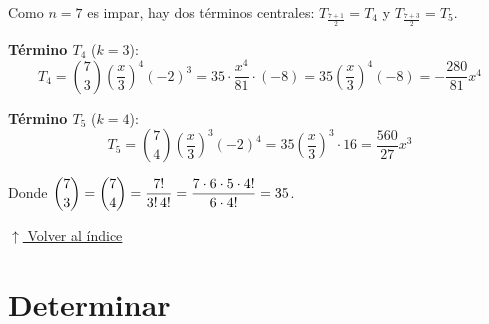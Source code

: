 \documentclass[12pt]{article}
\newcommand{\volverindice}{%
    \vspace{1em}%
    \begin{flushright}%
        \hyperlink{indice}{\small $\uparrow$ Volver al índice}%
    \end{flushright}%
}
\begin{document}
\begin{enumerate}[label=\alph*.-]
    Como $n=7$ es impar, hay dos términos centrales: $T_{\frac{7+1}{2}} = T_4$ y
    $T_{\frac{7+3}{2}} = T_5$.

    \textbf{Término $T_4$} ($k=3$):
    \[
    T_4 = \binom{7}{3}\left(\frac{x}{3}\right)^4(-2)^3
    = 35\cdot\frac{x^4}{81}\cdot(-8)
    = 35\left(\frac{x}{3}\right)^4\!(-8)
    = -\frac{280}{81}{x^4}
    \]

    \textbf{Término $T_5$} ($k=4$):
    \[
    T_5 = \binom{7}{4}\left(\frac{x}{3}\right)^3(-2)^4
    = 35\left(\frac{x}{3}\right)^3\cdot16
    = \frac{560}{27}{x^3}
    \]

    Donde $\dbinom{7}{3} = \dbinom{7}{4} = \dfrac{7!}{3!\,4!} = \dfrac{7\cdot6\cdot5\cdot4!}{6\cdot4!} = 35$.

\end{enumerate}

\volverindice
\newpage

\section{Determinar}
\end{document}
